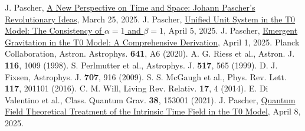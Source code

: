 \documentclass[12pt,a4paper]{article}
\begin{document}
\begin{thebibliography}{99}
		 J. Pascher, \href{https://github.com/jpascher/T0-Time-Mass-Duality/tree/main/2/pdf/English/Eine neue Perspektive auf Zeit und Raum Johann Paschers revolutionäre Ideen_en.pdf}{A New Perspective on Time and Space: Johann Pascher’s Revolutionary Ideas}, March 25, 2025.
		 J. Pascher, \href{https://github.com/jpascher/T0-Time-Mass-Duality/tree/main/2/pdf/English/Die Konsistenz von alpha = 1 und beta = 1_en.pdf}{Unified Unit System in the T0 Model: The Consistency of \(\alpha = 1\) and \(\beta = 1\)}, April 5, 2025.
		 J. Pascher, \href{https://github.com/jpascher/T0-Time-Mass-Duality/tree/main/2/pdf/English/Emergente Gravitation im T0-Modell Eine formale Herleitung_en.pdf}{Emergent Gravitation in the T0 Model: A Comprehensive Derivation}, April 1, 2025.
		 Planck Collaboration, Astron. Astrophys. \textbf{641}, A6 (2020).
		 A. G. Riess et al., Astron. J. \textbf{116}, 1009 (1998).
		 S. Perlmutter et al., Astrophys. J. \textbf{517}, 565 (1999).
		 D. J. Fixsen, Astrophys. J. \textbf{707}, 916 (2009).
		 S. S. McGaugh et al., Phys. Rev. Lett. \textbf{117}, 201101 (2016).
		 C. M. Will, Living Rev. Relativ. \textbf{17}, 4 (2014).
		 E. Di Valentino et al., Class. Quantum Grav. \textbf{38}, 153001 (2021).
				 J. Pascher, \href{https://github.com/jpascher/T0-Time-Mass-Duality/tree/main/2/pdf/English/Quantum Field Theoretical Treatment of the Intrinsic Time Field in the T0 Model_en.pdf}{Quantum Field Theoretical Treatment of the Intrinsic Time Field in the T0 Model}, April 8, 2025.
	\end{thebibliography}
	
\end{document}
